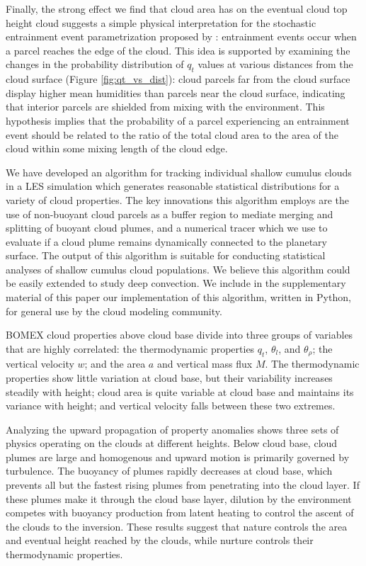 \documentclass[acp]{copernicus}
\begin{document}
Finally, the strong effect we find that cloud area has on the eventual cloud 
top height cloud suggests a simple physical interpretation for the stochastic 
entrainment event parametrization proposed by \cite{Romps2010a}: entrainment 
events occur when a parcel reaches the edge of the cloud. This idea is 
supported by examining the changes in the probability distribution of $q_t$ 
values at various distances from the cloud surface (Figure 
\ref{fig:qt_vs_dist}): cloud parcels far from the cloud surface display higher
mean humidities than parcels near the cloud surface, indicating that interior 
parcels are shielded from mixing with the environment.  This hypothesis 
implies that the probability of a parcel experiencing an entrainment event 
should be related to the ratio of the total cloud area to the area of the 
cloud within some mixing length of the cloud edge.


\conclusions
We have developed an algorithm for tracking individual shallow cumulus clouds 
in a LES simulation which generates reasonable statistical distributions for a 
variety of cloud properties.  The key innovations this algorithm employs are 
the use of non-buoyant cloud parcels as a buffer region to mediate merging and 
splitting of buoyant cloud plumes, and a numerical tracer which we use to 
evaluate if a cloud plume remains dynamically connected to the planetary 
surface.  The output of this algorithm is suitable for conducting statistical 
analyses of shallow cumulus cloud populations.  We believe this algorithm could 
be easily extended to study deep convection.  We include in the supplementary 
material of this paper our implementation of this algorithm, written in Python, 
for general use by the cloud modeling community.

BOMEX cloud properties above cloud base divide into three groups of variables 
that are highly correlated: the thermodynamic properties $q_t$, $\theta_l$, 
and $\theta_\rho$; the vertical velocity $w$; and the area $a$ and vertical 
mass flux $M$.  The thermodynamic properties show little variation at cloud 
base, but their variability increases steadily with height; cloud area is 
quite variable at cloud base and maintains its variance with height; and 
vertical velocity falls between these two extremes.

Analyzing the upward propagation of property anomalies shows three sets of 
physics operating on the clouds at different heights.  Below cloud base, cloud 
plumes are large and homogenous and upward motion is primarily governed by 
turbulence.  The buoyancy of plumes rapidly decreases at cloud base, which 
prevents all but the fastest rising plumes from penetrating into the cloud 
layer.  If these plumes make it through the cloud base layer, dilution by the 
environment competes with buoyancy production from latent heating to control 
the ascent of the clouds to the inversion.  These results suggest that 
nature controls the area and eventual height reached by the clouds, while 
nurture controls their thermodynamic properties.
\end{document}
